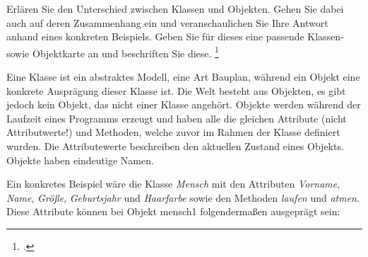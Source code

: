 \documentclass{bschlangaul-aufgabe}
\begin{document}

Erlären Sie den Unterschied zwischen Klassen und
Objekten. Gehen Sie dabei auch auf deren Zusammenhang ein
und veranschaulichen Sie Ihre Antwort anhand eines konkreten Beispiels.
Geben Sie für dieses eine passende Klassen- sowie Objektkarte an und
beschriften Sie diese.
\footcite{oomup:ab:1}

\begin{bAntwort}
Eine Klasse ist ein abstraktes Modell, eine Art Bauplan, während ein
Objekt eine konkrete Ausprägung dieser Klasse ist. Die Welt besteht aus
Objekten, es gibt jedoch kein Objekt, das nicht einer Klasse angehört.
Objekte werden während der Laufzeit eines Programms erzeugt und haben
alle die gleichen Attribute (nicht Attributwerte!) und Methoden, welche
zuvor im Rahmen der Klasse definiert wurden. Die Attributewerte
beschreiben den aktuellen Zustand eines Objekts. Objekte haben
eindeutige Namen.

Ein konkretes Beispiel wäre die Klasse \emph{Mensch} mit den Attributen
\emph{Vorname}, \emph{Name}, \emph{Größe}, \emph{Geburtsjahr} und
\emph{Haarfarbe} sowie den Methoden \emph{laufen} und \emph{atmen}.
Diese Attribute können bei Objekt mensch1 folgendermaßen ausgeprägt
sein:
\end{bAntwort}
\end{document}
